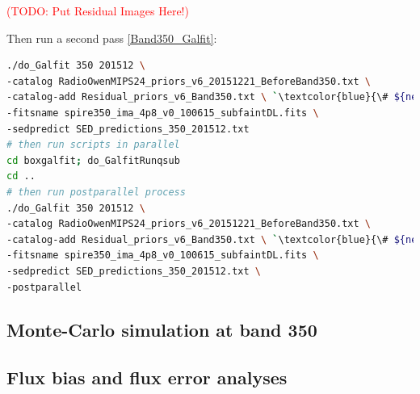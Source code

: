\documentclass[11pt,a4paper]{article}
\begin{document}
\textcolor{red}{(TODO: Put Residual Images Here!)}

Then run a second pass \ref{Band350_Galfit}: 

\begin{lstlisting}[language=bash]
./do_Galfit 350 201512 \
-catalog RadioOwenMIPS24_priors_v6_20151221_BeforeBand350.txt \
-catalog-add Residual_priors_v6_Band350.txt \ `\textcolor{blue}{\# ${new!}$}`
-fitsname spire350_ima_4p8_v0_100615_subfaintDL.fits \
-sedpredict SED_predictions_350_201512.txt
# then run scripts in parallel 
cd boxgalfit; do_GalfitRunqsub
cd ..
# then run postparallel process
./do_Galfit 350 201512 \
-catalog RadioOwenMIPS24_priors_v6_20151221_BeforeBand350.txt \
-catalog-add Residual_priors_v6_Band350.txt \ `\textcolor{blue}{\# ${new!}$}`
-fitsname spire350_ima_4p8_v0_100615_subfaintDL.fits \
-sedpredict SED_predictions_350_201512.txt \
-postparallel
\end{lstlisting}

\subsection{Monte-Carlo simulation at band 350}
\label{Band350_Galsim}


\subsection{Flux bias and flux error analyses}
\label{Band350_simanalyses}
\end{document}
